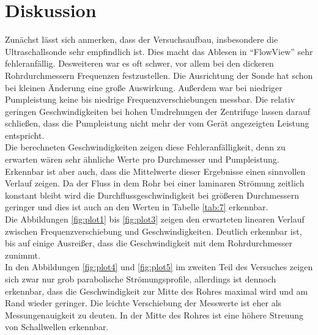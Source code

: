 \section{Diskussion}
Zunächst lässt sich anmerken, dass der Versuchsaufbau, insbesondere die Ultraschallsonde sehr empfindlich ist. Dies macht das Ablesen in \enquote{FlowView} sehr fehleranfällig. Desweiteren war es 
oft schwer, vor allem bei den dickeren Rohrdurchmessern Frequenzen festzustellen. Die Ausrichtung der Sonde hat schon bei kleinen Änderung eine große Auswirkung. Außerdem war bei niedriger Pumpleistung
keine bis niedrige Frequenzverschiebungen messbar. Die relativ geringen Geschwindigkeiten bei hohen Umdrehungen der Zentrifuge lassen darauf schließen, dass die Pumpleistung nicht mehr der vom Gerät angezeigten Leistung entspricht.
\\
\newline
Die berechneten Geschwindigkeiten zeigen diese Fehleranfälligkeit, denn zu erwarten wären sehr ähnliche Werte pro Durchmesser und Pumpleistung. Erkennbar ist aber auch, dass die Mittelwerte dieser Ergebnisse 
einen sinnvollen Verlauf zeigen. Da der Fluss in dem Rohr bei einer laminaren Strömung zeitlich konstant bleibt wird die Durchflussgeschwindigkeit bei größeren Durchmessern geringer und dies ist auch an den Werten in Tabelle \ref{tab:7} erkennbar.
\\
\newline
Die Abbildungen \ref{fig:plot1} bis \ref{fig:plot3} zeigen den erwarteten linearen Verlauf zwischen Frequenzverschiebung und Geschwindigkeiten. Deutlich erkennbar ist, bis auf einige Ausreißer, dass die Geschwindigkeit mit dem Rohrdurchmesser
zunimmt.
\\
\newline
In den Abbildungen \ref{fig:plot4} und \ref{fig:plot5} im zweiten Teil des Versuches zeigen sich zwar nur grob parabolische Strömungsprofile, allerdings ist dennoch
erkennbar, dass die Geschwindigkeit zur Mitte des Rohres maximal wird und am Rand wieder geringer. Die leichte Verschiebung der Messwerte ist eher als Messungenauigkeit zu deuten. In der Mitte des Rohres ist eine höhere 
Streuung von Schallwellen erkennbar.




